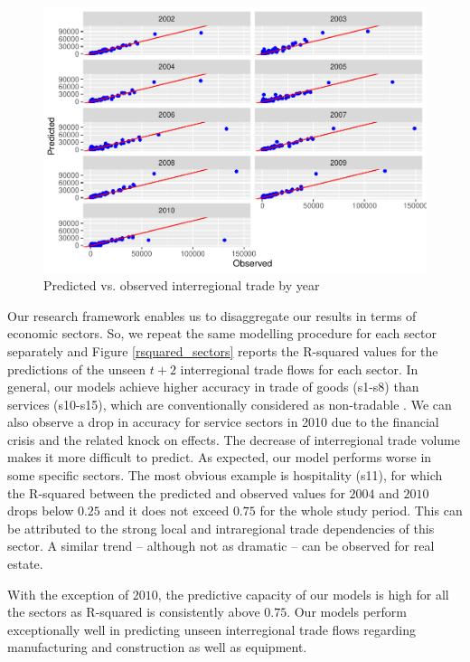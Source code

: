 \documentclass[]{interact}
\theoremstyle{plain}%
\theoremstyle{definition}
\theoremstyle{remark}
\begin{document}
\begin{figure}[p]
\includegraphics[width=1\linewidth]{hl_v2_files/figure-latex/unnamed-chunk-7-1} \caption{\label{prediction}Predicted vs. observed interregional trade by year}\label{fig:unnamed-chunk-7}
\end{figure}

Our research framework enables us to disaggregate our results in terms
of economic sectors. So, we repeat the same modelling procedure for each
sector separately and Figure \ref{rsquared_sectors} reports the
R-squared values for the predictions of the unseen \(t + 2\)
interregional trade flows for each sector. In general, our models
achieve higher accuracy in trade of goods (s1-s8) than services
(s10-s15), which are conventionally considered as non-tradable
\citep{jensen2005}. We can also observe a drop in accuracy for service
sectors in 2010 due to the financial crisis and the related knock on
effects. The decrease of interregional trade volume makes it more
difficult to predict. As expected, our model performs worse in some
specific sectors. The most obvious example is hospitality (s11), for
which the R-squared between the predicted and observed values for
\(2004\) and \(2010\) drops below \(0.25\) and it does not exceed
\(0.75\) for the whole study period. This can be attributed to the
strong local and intraregional trade dependencies of this sector. A
similar trend -- although not as dramatic -- can be observed for real
estate.

With the exception of \(2010\), the predictive capacity of our models is
high for all the sectors as R-squared is consistently above \(0.75\).
Our models perform exceptionally well in predicting unseen interregional
trade flows regarding manufacturing and construction as well as
equipment.
\end{document}
